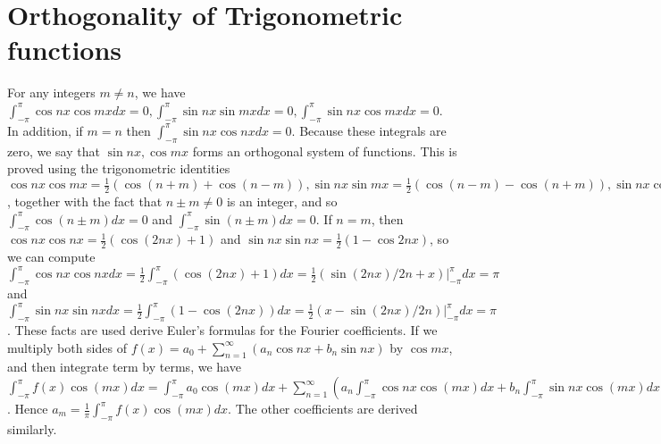 \section{Orthogonality of Trigonometric functions}
For any integers $m\neq n$, we have $\int_{-\pi}^\pi \cos nx \cos mx dx =0, \int_{-\pi}^\pi \sin nx \sin mx dx =0, \int_{-\pi}^\pi \sin nx \cos mx dx =0$.  In addition, if $m=n$ then $\int_{-\pi}^\pi \sin nx \cos nx dx =0$.  Because these integrals are zero, we say that $\sin nx, \cos mx$ forms an orthogonal system of functions. This is proved using the trigonometric identities $\cos nx \cos mx = \frac{1}{2}(\cos(n+m)+\cos(n-m)), \sin nx \sin mx = \frac{1}{2}(\cos(n-m)-\cos(n+m)), \sin nx \cos mx = \frac{1}{2}(\sin(n+m)+\sin(n-m))$, together with the fact that $n\pm m\neq 0$ is an integer, and so $\int_{-\pi}^\pi \cos (n\pm m) dx =0$ and $\int_{-\pi}^\pi \sin (n\pm m) dx =0$. If $n=m$, then $\cos nx \cos nx= \frac{1}{2}(\cos(2nx)+1)$ and $\sin nx \sin nx= \frac{1}{2}(1-\cos 2nx)$, so we can compute 
$
\int_{-\pi}^\pi \cos nx \cos nx dx = 
\frac{1}{2}\int_{-\pi}^\pi (\cos(2nx)+1) dx = 
\frac{1}{2} (\sin(2nx)/2n+x)\big|_{-\pi}^\pi dx = 
\pi
$ 
and
$
\int_{-\pi}^\pi \sin nx \sin nx dx = 
\frac{1}{2}\int_{-\pi}^\pi (1-\cos(2nx)) dx = 
\frac{1}{2} (x-\sin(2nx)/2n)\big|_{-\pi}^\pi dx = 
\pi
$.  These facts are used derive Euler's formulas for the Fourier coefficients.  If we multiply both sides of 
$f(x) = a_0 + \sum_{n=1}^\infty (a_n\cos nx +b_n\sin nx)$
by $\cos mx$, and then integrate term by terms, we have 
$\int_{-\pi}^{\pi} f(x)\cos(mx)dx = \int_{-\pi}^{\pi}a_0 \cos(mx)dx + \sum_{n=1}^\infty (a_n\int_{-\pi}^{\pi}\cos nx \cos(mx)dx +b_n\int_{-\pi}^{\pi}\sin nx \cos(mx)dx) = 0+a_m\pi$.  Hence $a_m = \frac{1}{\pi}\int_{-\pi}^{\pi} f(x)\cos(mx)dx$.  The other coefficients are derived similarly.

